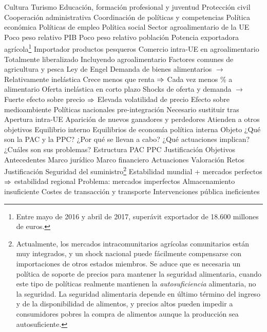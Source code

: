 \documentclass{nuevotema}
\begin{document}
\begin{esquemal}
				\4[] Cultura
				\4[] Turismo
				\4[] Educación, formación profesional y juventud
				\4[] Protección civil
				\4[] Cooperación administrativa
				\4 Coordinación de políticas y competencias
				\4[] Política económica
				\4[] Políticas de empleo
				\4[] Política social
			\3 Sector agroalimentario de la UE
				\4 Poco peso relativo PIB
				\4 Poco peso relativo población
				\4 Potencia exportadora agrícola\footnote{Entre mayo de 2016 y abril de 2017, superávit exportador de 18.600 millones de euros.}
				\4 Importador productos pesqueros
			\3 Comercio intra-UE en agroalimentario
				\4 Totalmente liberalizado
				\4 Incluyendo agroalimentario
			\3 Factores comunes de agricultura y pesca
				\4 Ley de Engel
				\4[] Demanda de bienes alimentarios
				\4[] $\to$ Relativamente inelástica
				\4[] Crece menos que renta
				\4[] $\Rightarrow$ Cada vez menos \% a alimentario
				\4 Oferta inelástica en corto plazo
				\4[] Shocks de oferta y demanda
				\4[] $\to$ Fuerte efecto sobre precio
				\4[] $\Rightarrow$ Elevada volatilidad de precio
				\4 Efecto sobre medioambiente
			\3 Políticas nacionales pre-integración
				\4 Necesario sustituir tras
				\4[] Apertura intra-UE
				\4 Aparición de nuevos ganadores y perdedores
				\4 Atienden a otros objetivos
				\4[] Equilibrio interno
				\4[] Equilibrios de economía política interna
		\2 Objeto
			\3 ¿Qué son la PAC y la PPC?
			\3 ¿Por qué se llevan a cabo?
			\3 ¿Qué actuaciones implican?
			\3 ¿Cuáles son sus problemas?
		\2 Estructura
			\3 PAC
			\3 PPC
				\4 Justificación
				\4 Objetivos
				\4 Antecedentes
				\4 Marco jurídico
				\4 Marco financiero
				\4 Actuaciones
				\4 Valoración
				\4 Retos
	\1 \marcar{Política Agrícola Común}
		\2 Justificación
			\3 Seguridad del suministro\footnote{Actualmente, los mercados intracomunitarios agrícolas comunitarios están muy integrados, y un shock nacional puede fácilmente compensarse con importaciones de otros estados miembros. Se aduce que es necesaria un política de soporte de precios para mantener la seguridad alimentaria, cuando este tipo de políticas realmente mantienen la \textit{autosuficiencia} alimentaria, no la seguridad. La seguridad alimentaria depende en último término del ingreso y de la disponibilidad de alimentos, y precios altos pueden impedir a consumidores pobres la compra de alimentos aunque la producción sea autosuficiente.}
				\4 Estabilidad mundial + mercados perfectos
				\4[] $\Rightarrow$ estabilidad regional
				\4 Problema: mercados imperfectos
				\4[] Almacenamiento insuficiente
				\4[] Costes de transacción y transporte
				\4[] Intervenciones pública ineficientes

\end{esquemal}
\end{document}
